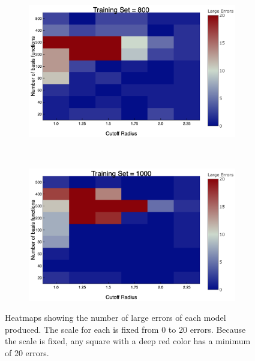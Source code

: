 \begin{figure}
\begin{subfigure}{0.5\textwidth}
    \caption{} 
    \label{numErrors6}
  \end{subfigure}%
    \hspace*{\fill}   %
  \begin{subfigure}{0.5\textwidth}
    \includegraphics[width=\linewidth]{Figures/numErrors8}
    \caption{} 
    \label{numErrors8}
  \end{subfigure}%
    \\
  \begin{subfigure}{0.5\textwidth}
    \includegraphics[width=\linewidth]{Figures/numErrors10}
    \caption{} 
    \label{numErrors10}
  \end{subfigure}%
\caption{Heatmaps showing the number of large errors of each model produced. The scale for each is fixed from 0 to 20 errors. Because the scale is fixed, any square with a deep red color has a minimum of 20 errors.}
\label{numErrorHeatmaps}
\end{figure}


